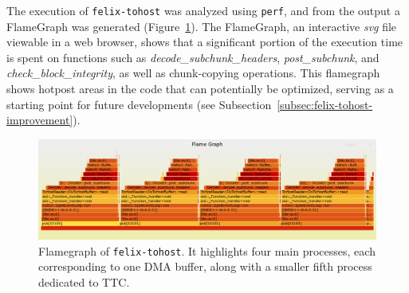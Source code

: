 The execution of \texttt{felix-tohost} was analyzed using \texttt{perf}, and from the output a FlameGraph \cite{flamegraph} was generated (Figure~\ref{fig:felix-tohost-flamegraph}). The FlameGraph, an interactive \emph{svg} file viewable in a web browser, shows that a significant portion of the execution time is spent on functions such as \emph{decode\_subchunk\_headers}, \emph{post\_subchunk}, and \emph{check\_block\_integrity}, as well as chunk-copying operations. This flamegraph shows hotpost areas in the code that can potentially be optimized, serving as a starting point for future developments (see Subsection~\ref{subsec:felix-tohost-improvement}).

\begin{figure}[htbp]
\centering
\includegraphics[width=\textwidth]{images/results/flamegraph.png}
\caption[Flamegraph of felix-tohost]{Flamegraph of \texttt{felix-tohost}. It highlights four main processes, each corresponding to one \acs{DMA} buffer, along with a smaller fifth process dedicated to \acs{TTC}.}\label{fig:felix-tohost-flamegraph}
\end{figure}
